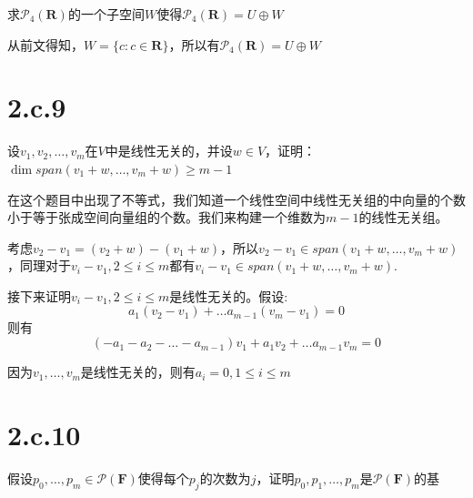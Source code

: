 \documentclass[10pt,a4paper,UTF8]{article}
\begin{document}
\begin{problem}
求\(\mathcal{P}_{4}(\mathbf{R})\)的一个子空间\(W\)使得\(\mathcal{P}_{4}( \mathbf{R}) = U\oplus W\)
\end{problem}

\begin{answer}
从前文得知，\(W = \{c:c\in \mathbf{R}\}\)，所以有\(\mathcal{P}_{4}( \mathbf{R}) = U\oplus W\)
\end{answer}
\section{2.c.9}
\label{sec:org0ff89ad}


\begin{problem}
设\(v_{1},v_{2},\ldots ,v_{m}\)在\(V\)中是线性无关的，并设\(w\in V\)，证明：\(\dim span(v_{1} + w,\ldots ,v_{m}+w) \geq m-1\)
\end{problem}

\begin{answer}
在这个题目中出现了不等式，我们知道一个线性空间中线性无关组的中向量的个数小于等于张成空间向量组的个数。我们来构建一个维数为\(m-1\)的线性无关组。

考虑\(v_{2} -v_{1} = (v_{2} + w) - (v_{1} + w)\)，所以\(v_{2}-v_{1}\in span(v_{1} + w,\ldots ,v_{m}+w)\)，同理对于\(v_{i} - v_{1},2\leq i \leq m\)都有\(v_{i}-v_{1}\in span(v_{1} + w,\ldots ,v_{m}+w)\). 

接下来证明\(v_{i}-v_{1}, 2\leq i \leq m\)是线性无关的。假设:
\begin{equation}
\label{eq:4}
a_{1}(v_{2} - v_{1}) + \ldots a_{m-1}(v_{m} - v_{1}) = 0
\end{equation}
则有
\begin{equation}
\label{eq:5}
(-a_{1} - a_{2} - \ldots -a_{m-1})v_{1} + a_{1}v_{2} + \ldots a_{m-1} v_{m} = 0
\end{equation}

因为\(v_{1},\ldots ,v_{m}\)是线性无关的，则有\(a_{i} = 0, 1\leq i \leq m\)
\end{answer}

\section{2.c.10}
\label{sec:org1a28de9}


\begin{problem}
假设\(p_{0},\ldots ,p_{m}\in \mathcal{P}( \mathbf{F})\)使得每个\(p_{j}\)的次数为\(j\)，证明\(p_{0},p_{1},\ldots ,p_{m}\)是\(\mathcal{P}( \mathbf{F})\)的基
\end{problem}
\end{document}
